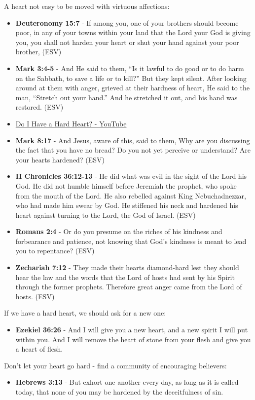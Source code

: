 \documentclass[11pt]{article}
\begin{document}
A heart not easy to be moved with virtuous affections:
\begin{itemize}
\item \textbf{Deuteronomy 15:7} - If among you, one of your brothers should become poor, in any of your towns within your land that the Lord your God is giving you, you shall not harden your heart or shut your hand against your poor brother, (ESV)
\item \textbf{Mark 3:4-5} - And He said to them, “Is it lawful to do good or to do harm on the Sabbath, to save a life or to kill?” But they kept silent. After looking around at them with anger, grieved at their hardness of heart, He said to the man, “Stretch out your hand.” And he stretched it out, and his hand was restored. (ESV)
\item \href{https://www.youtube.com/watch?v=JaMVzW9yiBc}{Do I Have a Hard Heart? - YouTube}
\item \textbf{Mark 8:17} - And Jesus, aware of this, said to them, Why are you discussing the fact that you have no bread? Do you not yet perceive or understand? Are your hearts hardened? (ESV)
\item \textbf{II Chronicles 36:12-13} - He did what was evil in the sight of the Lord his God. He did not humble himself before Jeremiah the prophet, who spoke from the mouth of the Lord. He also rebelled against King Nebuchadnezzar, who had made him swear by God. He stiffened his neck and hardened his heart against turning to the Lord, the God of Israel. (ESV)
\item \textbf{Romans 2:4} - Or do you presume on the riches of his kindness and forbearance and patience, not knowing that God's kindness is meant to lead you to repentance? (ESV)
\item \textbf{Zechariah 7:12} - They made their hearts diamond-hard lest they should hear the law and the words that the Lord of hosts had sent by his Spirit through the former prophets. Therefore great anger came from the Lord of hosts. (ESV)
\end{itemize}

If we have a hard heart, we should ask for a new one:
\begin{itemize}
\item \textbf{Ezekiel 36:26} - And I will give you a new heart, and a new spirit I will put within you. And I will remove the heart of stone from your flesh and give you a heart of flesh.
\end{itemize}

Don't let your heart go hard - find a community of encouraging believers:
\begin{itemize}
\item \textbf{Hebrews 3:13} - But exhort one another every day, as long as it is called today, that none of you may be hardened by the deceitfulness of sin.
\end{itemize}
\end{document}
